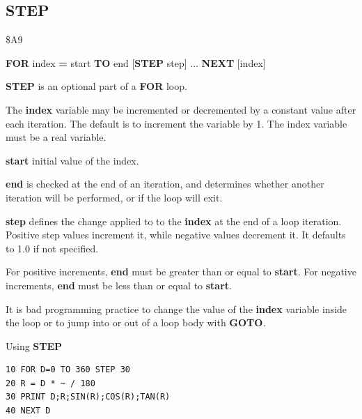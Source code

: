 
\newpage
\subsection{STEP}
\begin{description}[leftmargin=2cm,style=nextline]
\item [Token:] \$A9
\item [Format:] {\bf FOR} index {\bf =} start {\bf TO} end [{\bf STEP} step]
		... {\bf NEXT} [index]
\item [Usage:] {\bf STEP} is an optional part of a
               {\bf FOR} loop.

               The {\bf index} variable may be incremented or decremented
               by a constant value after each iteration. The default
               is to increment the variable by 1.
               The index variable must be a real variable.

               {\bf start} initial value of the index.

               {\bf end} is checked at the end of an iteration,
               and determines whether another iteration will be performed,
               or if the loop will exit.

               {\bf step} defines the change applied to
               to the {\bf index} at the end of a loop iteration.
               Positive step values increment it, while negative values
               decrement it. It defaults to 1.0 if not specified.

\item [Remarks:] For positive increments, {\bf end} must be greater
               than or equal to {\bf start}. For negative increments,
               {\bf end} must be less than or equal to {\bf start}.

               It is bad programming practice to change the value
               of the {\bf index} variable inside the loop or to
               jump into or out of a loop body with {\bf GOTO}.

\item [Example:] Using {\bf STEP}
\begin{tcolorbox}[colback=black,coltext=white]
\verbatimfont{\codefont}
\begin{verbatim}
10 FOR D=0 TO 360 STEP 30
20 R = D * ~ / 180
30 PRINT D;R;SIN(R);COS(R);TAN(R)
40 NEXT D
\end{verbatim}
\end{tcolorbox}
\end{description}

